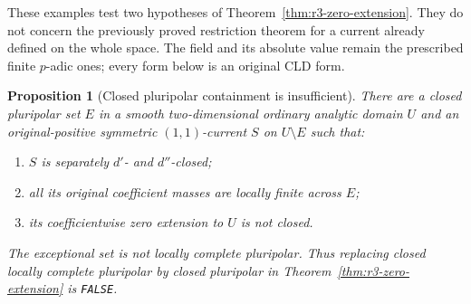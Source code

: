 \documentclass[11pt,a4paper]{article}
\numberwithin{equation}{section}
\newtheorem{proposition}[theorem]{Proposition}
\theoremstyle{definition}
\theoremstyle{remark}
\begin{document}
These examples test two hypotheses of
Theorem~\ref{thm:r3-zero-extension}. They do not concern the
previously proved restriction theorem for a current already
defined on the whole space. The field and its absolute value
remain the prescribed finite $p$-adic ones; every form below
is an original CLD form.

\begin{proposition}[Closed pluripolar containment is insufficient]
\label{prop:r3-zero-extension-noncomplete-false}
There are a closed pluripolar set $E$ in a smooth two-dimensional
ordinary analytic domain $U$ and an original-positive symmetric
$(1,1)$-current $S$ on $U\setminus E$ such that:
\begin{enumerate}
\item $S$ is separately $d'$- and $d''$-closed;
\item all its original coefficient masses are locally finite
      across $E$;
\item its coefficientwise zero extension to $U$ is not closed.
\end{enumerate}
The exceptional set is not locally complete pluripolar.
Thus replacing \emph{closed locally complete pluripolar} by
\emph{closed pluripolar} in Theorem~\ref{thm:r3-zero-extension}
is \texttt{FALSE}.
\end{proposition}
\end{document}
